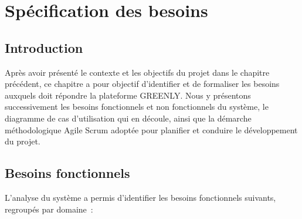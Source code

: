 \chapter{Spécification des besoins}

\section*{Introduction}
Après avoir présenté le contexte et les objectifs du projet dans le chapitre précédent, ce chapitre a pour objectif d'identifier et de formaliser les besoins auxquels doit répondre la plateforme GREENLY. Nous y présentons successivement les besoins fonctionnels et non fonctionnels du système, le diagramme de cas d'utilisation qui en découle, ainsi que la démarche méthodologique Agile Scrum adoptée pour planifier et conduire le développement du projet.

\section{Besoins fonctionnels}

L'analyse du système a permis d'identifier les besoins fonctionnels suivants, regroupés par domaine~:

